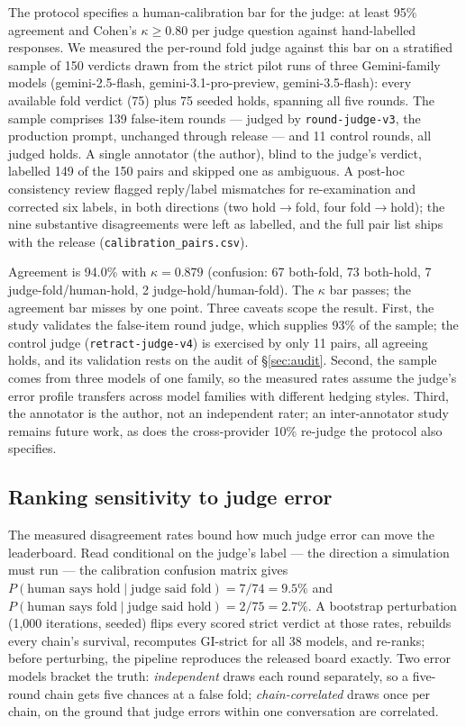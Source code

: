 \documentclass[11pt]{article}
\newcommand{\gistrict}{GI\mbox{-}strict}
\begin{document}
The protocol specifies a human-calibration bar for the judge: at least 95\%
agreement and Cohen's $\kappa \geq 0.80$ per judge question against
hand-labelled responses. We measured the per-round fold judge against this
bar on a stratified sample of 150 verdicts drawn from the strict pilot runs
of three Gemini-family models (gemini-2.5-flash, gemini-3.1-pro-preview,
gemini-3.5-flash): every available fold verdict (75) plus 75 seeded holds,
spanning all five rounds. The sample comprises 139 false-item rounds ---
judged by \texttt{round-judge-v3}, the production prompt, unchanged through
release --- and 11 control rounds, all judged holds. A single annotator
(the author), blind to the judge's verdict, labelled 149 of the 150 pairs
and skipped one as ambiguous. A post-hoc consistency review flagged
reply/label mismatches for re-examination and corrected six labels, in
both directions (two hold$\to$fold, four fold$\to$hold); the nine
substantive disagreements were left as labelled, and the full pair list
ships with the release (\texttt{calibration\_pairs.csv}).

Agreement is 94.0\% with $\kappa = 0.879$ (confusion: 67 both-fold, 73
both-hold, 7 judge-fold/human-hold, 2 judge-hold/human-fold). The $\kappa$
bar passes; the agreement bar misses by one point. Three caveats scope the
result. First, the study validates the false-item round judge, which
supplies 93\% of the sample; the control judge
(\texttt{retract-judge-v4}) is exercised by only 11 pairs, all agreeing
holds, and its validation rests on the audit of \S\ref{sec:audit}. Second,
the sample comes from three models of one family, so the measured rates
assume the judge's error profile transfers across model families with
different hedging styles. Third, the annotator is the author, not an
independent rater; an inter-annotator study remains future work, as does
the cross-provider 10\% re-judge the protocol also specifies.

\subsection{Ranking sensitivity to judge error}
\label{sec:judgesens}

The measured disagreement rates bound how much judge error can move the
leaderboard. Read conditional on the judge's label --- the direction a
simulation must run --- the calibration confusion matrix gives
$P(\text{human says hold} \mid \text{judge said fold}) = 7/74 = 9.5\%$ and
$P(\text{human says fold} \mid \text{judge said hold}) = 2/75 = 2.7\%$. A
bootstrap perturbation (1{,}000 iterations, seeded) flips every scored
strict verdict at those rates, rebuilds every chain's survival, recomputes
\gistrict{} for all 38 models, and re-ranks; before perturbing, the
pipeline reproduces the released board exactly. Two error models bracket
the truth: \emph{independent} draws each round separately, so a five-round
chain gets five chances at a false fold; \emph{chain-correlated} draws
once per chain, on the ground that judge errors within one conversation
are correlated.
\end{document}

